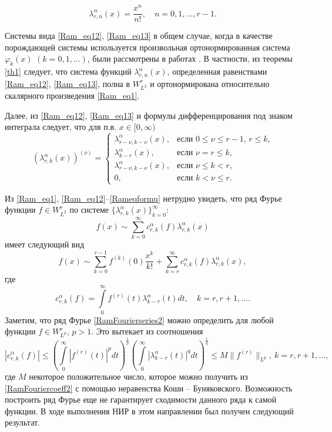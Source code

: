 \begin{equation}\label{Ram_eq13}
\lambda_{r,n}^{\alpha}(x) =\frac{x^n}{n!}, \quad n=0,1,\ldots, r-1.
\end{equation}

Системы вида \eqref{Ram_eq12}, \eqref{Ram_eq13} в общем случае, когда в качестве порождающей системы используется произвольная ортонормированная система $\varphi_k(x)$ $(k=0,1,\ldots)$, были рассмотрены в работах \cite{Ramlib4,Ramlib41,Ramlib42,Ramlib43,Ramlib44}.
В частности, из теоремы \ref{th1} \cite{Ramlib4} следует, что система функций $\lambda_{r,n}^\alpha(x)$, определенная равенствами \eqref{Ram_eq12}, \eqref{Ram_eq13}, полна в $W^r_{L^2}$ и ортонормирована относительно скалярного произведения \eqref{Ram_eq1}.

Далее, из \eqref{Ram_eq12}, \eqref{Ram_eq13} и формулы дифференцирования под знаком интеграла \cite[п. 509, с. 667]{Ramlib5} следует, что для п.в. $x\in[0,\infty)$
\begin{equation}\label{Rameqformu}
(\lambda_{r,k}^\alpha(x))^{(\nu)} =
\begin{cases}
\lambda_{r-\nu,k-\nu}^\alpha(x),&\text{если $0\le\nu\le r-1$, $r\le k$,}\\
\lambda_{k-r}^\alpha(x),&\text{если $\nu=r\le k$,}\\
\lambda_{r-\nu,k-\nu}^\alpha(x),&\text{если $\nu\le k< r$,}\\
0,&\text{если $k< \nu\le r$}.
\end{cases}
\end{equation}

Из \eqref{Ram_eq1}, \eqref{Ram_eq12}--\eqref{Rameqformu} нетрудно увидеть, что ряд Фурье функции $f\in W^r_{L^2}$ по системе  $\{\lambda^\alpha_{r,k}(x)\}_{k=0}^\infty$:
\begin{equation*}
f(x)\sim \sum_{k=0}^{\infty}c_{r,k}^\alpha(f)\lambda_{r,k}^\alpha(x)
\end{equation*}
имеет следующий вид
\begin{equation}\label{RamFourierseries2}
f(x)\sim \sum_{k=0}^{r-1}f^{(k)}(0)\frac{x^k}{k!}+\sum_{k=r}^{\infty} c_{r,k}^\alpha(f)\lambda_{r,k}^\alpha(x),
\end{equation}
где
\begin{equation}\label{RamFouriercoeff2}
c_{r,k}^\alpha(f)=\int\limits_0^\infty f^{(r)}(t)\lambda_{k-r}^\alpha(t)dt, \quad k=r, r+1, \ldots.
\end{equation}
Заметим, что ряд Фурье \eqref{RamFourierseries2} можно определить для любой функции $f\in W^r_{L^p}$, $p>1$. Это вытекает из соотношения 
$$
|c_{r,k}^\alpha(f)|\leq \left(\int\limits_0^\infty|f^{(r)}(t)|^p dt\right)^{\frac{1}{p}}
\left(\int\limits_0^\infty|\lambda_{k-r}^\alpha(t)|^q dt\right)^{\frac{1}{q}}\leq M\|f^{(r)}\|_{L^p},\ k=r, r+1, \ldots,
$$
где $M$ некоторое положительное число, которое можно получить из \eqref{RamFouriercoeff2} с помощью неравенства Коши -- Буняковского. 
Возможность построить ряд Фурье еще не гарантирует сходимости данного ряда к самой функции. В ходе выполнения НИР в этом направлении был получен следующий результат.

